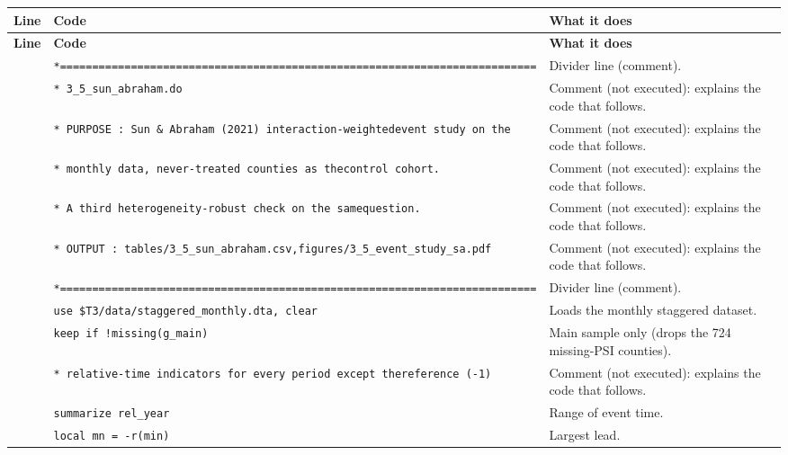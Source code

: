 \documentclass[10pt]{article}
\newcommand{\codetable}[1]{%
{\footnotesize
\begin{longtable}{>{\raggedleft\arraybackslash}p{0.55cm}>{\raggedright\arraybackslash}p{8.3cm}>{\raggedright\arraybackslash}p{8.0cm}}
\toprule \textbf{Line} & \textbf{Code} & \textbf{What it does}\\ \midrule \endfirsthead
\toprule \textbf{Line} & \textbf{Code} & \textbf{What it does}\\ \midrule \endhead
\bottomrule \endfoot
#1
\end{longtable}}}
\begin{document}
\codetable{1 & \texttt{*=========================================================\newline \hspace*{1em}=================} & Divider line (comment).\\
2 & \texttt{* 3\_5\_sun\_abraham.do} & Comment (not executed): explains the code that follows.\\
3 & \texttt{* PURPOSE : Sun \& Abraham (2021) interaction-{}weighted\newline \hspace*{1em}event study on the} & Comment (not executed): explains the code that follows.\\
4 & \texttt{*           monthly data, never-{}treated counties as the\newline \hspace*{1em}control cohort.} & Comment (not executed): explains the code that follows.\\
5 & \texttt{*           A third heterogeneity-{}robust check on the same\newline \hspace*{1em}question.} & Comment (not executed): explains the code that follows.\\
6 & \texttt{* OUTPUT  : tables/3\_5\_sun\_abraham.csv,\newline \hspace*{1em}figures/3\_5\_event\_study\_sa.pdf} & Comment (not executed): explains the code that follows.\\
7 & \texttt{*=========================================================\newline \hspace*{1em}=================} & Divider line (comment).\\
8 & \texttt{use \textquotedbl{}\$T3/data/staggered\_monthly.dta\textquotedbl{}, clear} & Loads the monthly staggered dataset.\\
9 & \texttt{keep if !missing(g\_main)} & Main sample only (drops the 724 missing-PSI counties).\\
11 & \texttt{* relative-{}time indicators for every period except the\newline \hspace*{1em}reference (-{}1)} & Comment (not executed): explains the code that follows.\\
12 & \texttt{summarize rel\_year} & Range of event time.\\
13 & \texttt{local mn = -{}r(min)} & Largest lead.\\
}
\end{document}
